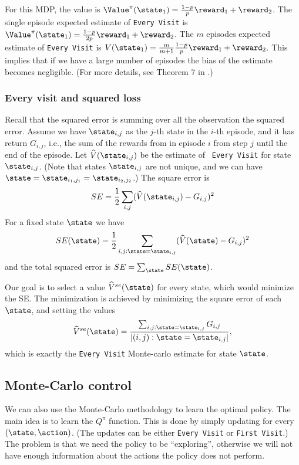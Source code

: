 For this MDP, the value is
$\Value^\pi(\state_1)=\frac{1-p}{p}\reward_1+\reward_2$. The single
episode expected estimate of {\tt Every Visit} is
$\Value^\pi(\state_1)=\frac{1-p}{2p}\reward_1+\reward_2$. The $m$
episodes expected estimate of {\tt Every Visit} is
$V(\state_1)=\frac{m}{m+1}\frac{1-p}{p}\reward_1+\reward_2$. This
implies that if we have a large number of episodes the bias of the
estimate becomes negligible. (For more details, see Theorem 7 in
\cite{SinghS96}.)

\subsubsection*{Every visit and squared loss}

Recall that the squared error is summing over all the observation
the squared error. Assume we have $\state_{i,j}$ as the $j$-th state
in the $i$-th episode, and it has return $G_{i,j}$, i.e., the sum of
the rewards from in episode $i$ from step $j$ until the end of the
episode. Let $\widehat{V}(\state_{i,j})$ be the estimate of {\tt
Every Visit} for state $\state_{i,j}$. (Note that states
$\state_{i,j}$ are not unique, and we can have
$\state=\state_{i_1,j_1}=\state_{i_2,j_2}$.) The square error is
\[
SE=\frac{1}{2}\sum_{i,j} (\widehat{V}(\state_{i,j})-G_{i,j})^2
\]
For a fixed state $\state$ we have
\[
SE(\state)=\frac{1}{2}\sum_{i,j:\state=\state_{i,j}}
(\widehat{V}(\state)-G_{i,j})^2
\]
and the total squared error is $SE=\sum_\state SE(\state)$.

Our goal is to select a value $\widehat{V}^{se}(\state)$ for every
state, which would minimize the SE. The minimization is achieved by
minimizing the square error of each $\state$, and setting the values
\[
\widehat{V}^{se}(\state)=\frac{\sum_{i,j:\state=\state_{i,j}}
G_{i,j}}{|{(i,j):\state=\state_{i,j}}|},
\]
which is exactly the {\tt Every Visit} Monte-carlo estimate for
state $\state$.

\subsection{Monte-Carlo control}

We can also use the Monte-Carlo methodology to learn the optimal
policy.
%
The main idea is to learn the $Q^\pi$ function. This is done by
simply updating for every $(\state,\action)$. (The updates can be
either {\tt Every Visit} or {\tt First Visit}.) The problem is that
we need the policy to be ``exploring'', otherwise we will not have
enough information about the actions the policy does not perform.

